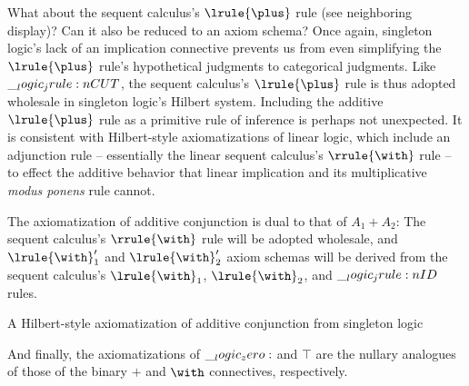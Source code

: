 What about the sequent calculus's $\lrule{\plus}$ rule (see neighboring display)?%
Can it also be reduced to an axiom schema?
Once again, singleton logic's lack of an implication connective prevents us from even simplifying the $\lrule{\plus}$ rule's hypothetical judgments to categorical judgments.
Like $\__logic_jrule:n {CUT}$, the sequent calculus's $\lrule{\plus}$ rule is thus adopted wholesale in singleton logic's Hilbert system.
Including the additive $\lrule{\plus}$ rule as a primitive rule of inference is perhaps not unexpected.
It is consistent with Hilbert-style axiomatizations of linear logic\autocite{Avron:TCS88}, which include an adjunction rule -- essentially the linear sequent calculus's $\rrule{\with}$ rule -- to effect the additive behavior that linear implication and its multiplicative \emph{modus ponens} rule cannot.


The axiomatization of additive conjunction is dual to that of $A_1 \plus A_2$:
The sequent calculus's $\rrule{\with}$ rule will be adopted wholesale, and $\lrule{\with}'_1$ and $\lrule{\with}'_2$ axiom schemas will be derived from the sequent calculus's $\lrule{\with}_1$, $\lrule{\with}_2$, and $\__logic_jrule:n {ID}$ rules.
%
\begin{marginfigure}
  \caption{A Hilbert-style axiomatization of additive conjunction from singleton logic}
\end{marginfigure}%
%
And finally, the axiomatizations of $\__logic_zero:$ and $\top$ are the nullary analogues of those of the binary $\plus$ and $\with$ connectives, respectively.

